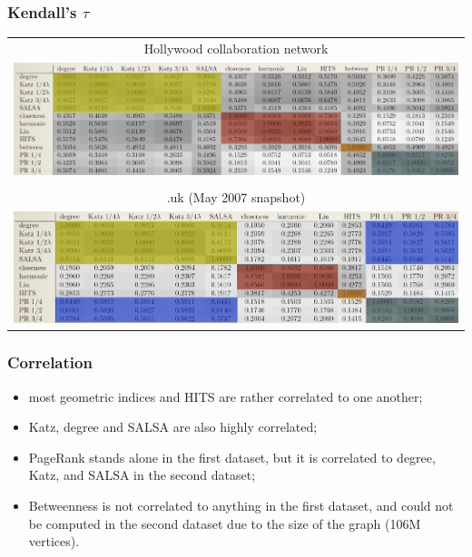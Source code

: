 \begin{frame}
  \frametitle{Kendall's $\tau$}
  \begin{tabular}{c}
    Hollywood collaboration network\\
    \includegraphics[width=\textwidth]{imgs/kendall2.pdf}\\
    \medskip \\
    .uk (May 2007 snapshot)\\
    \includegraphics[width=\textwidth]{imgs/kendal.pdf}\\
  \end{tabular}
\end{frame}

\begin{frame}
  \frametitle{Correlation}
  \begin{itemize}
    \pause \item most geometric indices and HITS
    are rather correlated to one another;
    \pause \item Katz, degree and SALSA are also
    highly correlated;
    \pause \item PageRank stands alone in the first dataset, but it is correlated to degree, Katz, and SALSA in the second dataset;
    \pause \item Betweenness is not correlated to anything in the first dataset, and could not be computed in the second dataset due to the size of the graph (106M vertices).
\end{itemize}
\end{frame}
